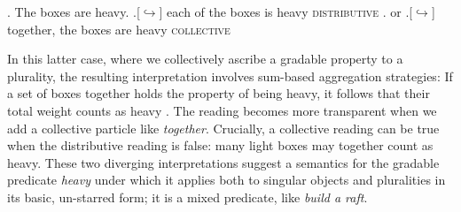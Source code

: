 \documentclass[linguex]{sp}
\begin{document}
\ex. The boxes are heavy.
\a.[$\hookrightarrow$] each of the boxes is heavy \hfill \textsc{distributive}
\z. or
\a.[$\hookrightarrow$] together, the boxes are heavy \hfill \textsc{collective}

In this latter case, where we collectively ascribe a gradable property to a plurality, the resulting interpretation involves sum-based aggregation strategies: If a set of boxes together holds the property of being heavy, it follows that their total weight counts as heavy \citep{scha1984}. The reading becomes more transparent when we add a collective particle like \emph{together}. Crucially, a collective reading can be true when the distributive reading is false: many light boxes may together count as heavy. These two diverging interpretations suggest a semantics for the gradable predicate \emph{heavy} under which it applies both to singular objects and pluralities in its basic, un-starred form; it is a mixed predicate, like \emph{build a raft}. 
\end{document}
